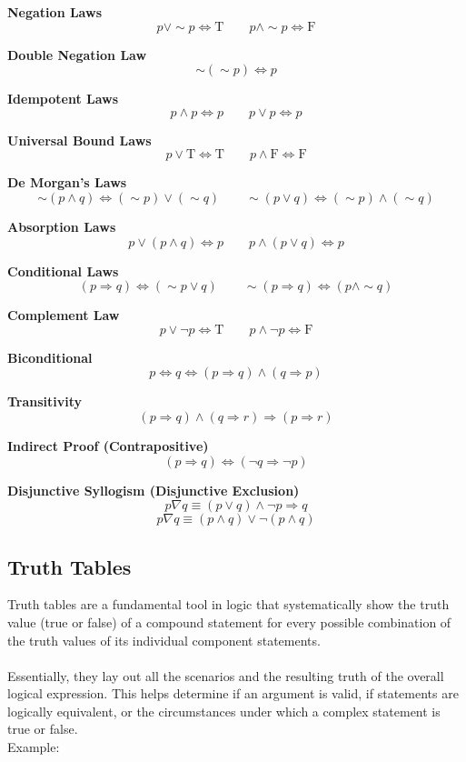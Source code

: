 \textbf{Negation Laws}
\[
p \lor \sim p \Leftrightarrow \text{T} \qquad p \land \sim p \Leftrightarrow \text{F}
\]

\textbf{Double Negation Law}
\[
\sim(\sim p) \Leftrightarrow p
\]

\textbf{Idempotent Laws}
\[
p \land p \Leftrightarrow p \qquad p \lor p \Leftrightarrow p
\]

\textbf{Universal Bound Laws}
\[
p \lor \text{T} \Leftrightarrow \text{T} \qquad p \land \text{F} \Leftrightarrow \text{F}
\]

\textbf{De Morgan’s Laws}
\[
\sim (p \land q) \Leftrightarrow (\sim p) \lor (\sim q) \qquad
\sim (p \lor q) \Leftrightarrow (\sim p) \land (\sim q)
\]

\textbf{Absorption Laws}
\[
p \lor (p \land q) \Leftrightarrow p \qquad p \land (p \lor q) \Leftrightarrow p
\]

\textbf{Conditional Laws}
\[
(p \Rightarrow q) \Leftrightarrow (\sim p \lor q) \qquad \sim(p \Rightarrow q) \Leftrightarrow (p \land \sim q)
\]

\textbf{Complement Law}
\[
p \lor \neg p \Leftrightarrow \text{T} \qquad p \land \neg p \Leftrightarrow \text{F}
\]

\textbf{Biconditional}
\[
p \Leftrightarrow q \Leftrightarrow (p \Rightarrow q) \land (q \Rightarrow p)
\]

\textbf{Transitivity}
\[
(p \Rightarrow q) \land (q \Rightarrow r) \Rightarrow (p \Rightarrow r)
\]

\textbf{Indirect Proof (Contrapositive)}
\[
(p \Rightarrow q) \Leftrightarrow (\neg q \Rightarrow \neg p)
\]

\textbf{Disjunctive Syllogism (Disjunctive Exclusion)}
\[
   p \nabla q \equiv (p \lor q) \land \neg p \Rightarrow q
\]
\[
  p \nabla q \equiv(p \land q) \lor \neg  (p \land q)
\]

\subsection{Truth Tables}

Truth tables are a fundamental tool in logic that systematically show the truth value 
(true or false) of a compound statement for every possible combination of the truth values of its individual component statements.\\\\
Essentially, they lay out all the scenarios and the resulting truth of the overall logical expression. This helps determine if an argument is valid, if statements are logically equivalent, or the circumstances under which a complex statement is true or false.\\
Example:
\smallskip

